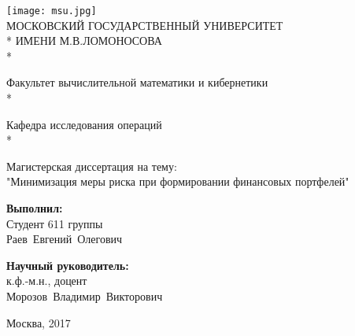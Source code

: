 \documentclass[18pt,a4paper]{article}
\theoremstyle{plain}
\theoremstyle{definition}
\begin{document}
  \begin{titlepage}
 \begin{center}
\texttt{[image: msu.jpg]}\\


    МОСКОВСКИЙ ГОСУДАРСТВЕННЫЙ УНИВЕРСИТЕТ\\*
    ИМЕНИ М.В.ЛОМОНОСОВА \\*



    \hrulefill
    \end{center}

    \begin{center}
   \Large Факультет вычислительной математики и кибернетики\\*
    \end{center}
\begin{center}
   \Large Кафедра исследования операций\\*
    \end{center}

    \vspace{10em}

    \begin{center}
    \Large Магистерская диссертация на тему:\\
    "Минимизация меры риска при формировании финансовых портфелей"
    \end{center}

    \vspace{10em}


\begin{flushright}
  \large
  \textbf{Выполнил:}\\
  Студент 611 группы\\
  Раев~Евгений~Олегович

  \vspace{5mm}

  \textbf{Научный руководитель:}\\
  к.ф.-м.н., доцент\\
  Морозов~Владимир~Викторович
\end{flushright}

    \vspace{\fill}

    \begin{center}
   Москва, 2017
    \end{center}

    \end{titlepage}
\fontsize{14pt}{20pt}\selectfont
\tableofcontents
\newpage
\end{document}
